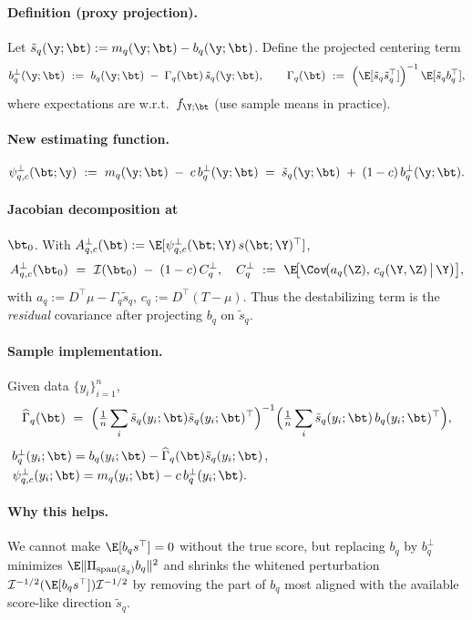 \newcommand{\Ps}{\Psi_{n;q,c}}
\newcommand{\sqt}{\tilde s_q}

\paragraph{Definition (proxy projection).}
Let \(\sqt(\y;\bt):=m_q(\y;\bt)-b_q(\y;\bt)\).
Define the projected centering term
\[
b_q^\perp(\y;\bt)\ :=\ b_q(\y;\bt)\;-\;\Gamma_q(\bt)\,\sqt(\y;\bt),
\qquad
\Gamma_q(\bt)\ :=\ \Big(\E[\sqt\sqt^\top]\Big)^{-1}\,\E[\sqt b_q^\top],
\]
where expectations are w.r.t.\ \(f_{\Y;\bt}\) (use sample means in practice).

\paragraph{New estimating function.}
\[
\psi^{\perp}_{q,c}(\bt;\y)\ :=\ m_q(\y;\bt)\;-\;c\,b_q^\perp(\y;\bt)
\;=\; \sqt(\y;\bt)\;+\; (1-c)\,b_q^\perp(\y;\bt).
\]

\paragraph{Jacobian decomposition at }\(\bt_0\).
With \(A^{\perp}_{q,c}(\bt):=\E[\psi^{\perp}_{q,c}(\bt;\Y)\,s(\bt;\Y)^\top]\),
\[
A^{\perp}_{q,c}(\bt_0)\ =\ \mathcal I(\bt_0)\;-\;(1-c)\,C_q^\perp,
\quad
C_q^\perp\ :=\ \E\!\big[\Cov\!\big(a_q(\Z),\,c_q(\Y,\Z)\,\big|\,\Y\big)\big],
\]
with \(a_q:=D^\top\mu\!-\!\Gamma_q\sqt\), \(c_q:=D^\top(T-\mu)\).
Thus the destabilizing term is the \emph{residual} covariance after projecting \(b_q\) on \(\sqt\).

\paragraph{Sample implementation.}
Given data \(\{y_i\}_{i=1}^n\),
\[
\widehat\Gamma_q(\bt)\ =\ 
\Big(\tfrac1n\sum_i \sqt(y_i;\bt)\sqt(y_i;\bt)^\top\Big)^{-1}
\Big(\tfrac1n\sum_i \sqt(y_i;\bt)\,b_q(y_i;\bt)^\top\Big),
\]
\(\ b_q^\perp(y_i;\bt)=b_q(y_i;\bt)-\widehat\Gamma_q(\bt)\sqt(y_i;\bt)\),
\(\ \psi^{\perp}_{q,c}(y_i;\bt)=m_q(y_i;\bt)-c\,b_q^\perp(y_i;\bt).\)

\paragraph{Why this helps.}
We cannot make \(\E[b_q s^\top]=0\) without the true score, but replacing \(b_q\) by
\(b_q^\perp\) minimizes \(\E\|\Pi_{\mathrm{span}(\sqt)} b_q\|^2\) and shrinks the whitened
perturbation \(\mathcal I^{-1/2}(\E[b_q s^\top])\mathcal I^{-1/2}\) by removing the part of \(b_q\)
most aligned with the available score-like direction \(\sqt\).
